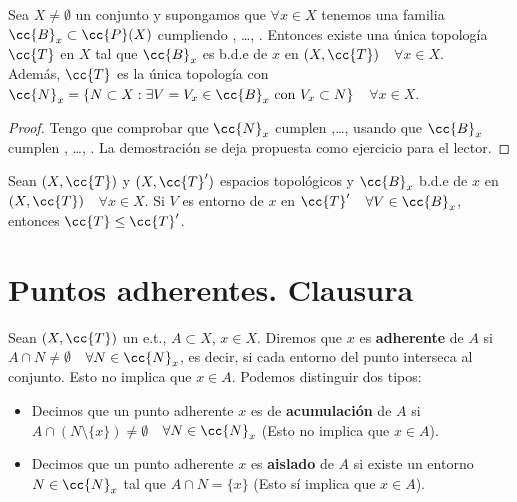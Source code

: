 \begin{prop}
    Sea $X \neq \emptyset$ un conjunto y supongamos que $\forall x \in X$ tenemos una familia $\cc{B}_x \subset \cc{P}(X)$ cumpliendo , \dots, . Entonces existe una única topología $\cc{T}$ en $X$ tal que $\cc{B}_x$ es b.d.e de $x$ en $(X,\cc{T})$\ \ $\forall x \in X$.\\

    Además, $\cc{T}$ es la única topología con $\cc{N}_x=\{N\subset X : \exists V=V_x \in \cc{B}_x\text{ con }V_x\subset N\}$\ \ $\forall x \in X$.

    \begin{proof}
        Tengo que comprobar que $\cc{N}_x$ cumplen ,\dots,  usando que $\cc{B}_x$ cumplen , \dots, . La demostración se deja propuesta como ejercicio para el lector. %
    \end{proof}
\end{prop}

\begin{ejercicio}
    Sean $(X, \cc{T})$ y $(X, \cc{T}')$ espacios topológicos y $\cc{B}_x$ b.d.e de $x$ en $(X,\cc{T})$\ \ $\forall x \in X$. Si $V$ es entorno de $x$ en $\cc{T}'$\ \ $\forall V \in \cc{B}_x$, entonces $\cc{T} \leq \cc{T}'$.
    \endsquare
\end{ejercicio}

\section{Puntos adherentes. Clausura}

\begin{definicion}
    Sean $(X, \cc{T})$ un e.t., $A\subset X$, $x\in X$. Diremos que $x$ es \textbf{adherente} de $A$ si $A\cap N\neq\emptyset$\ \ $\forall N \in \cc{N}_x$, es decir, si cada entorno del punto interseca al conjunto. Esto no implica que $x\in A$. Podemos distinguir dos tipos:
    \begin{itemize}
        \item Decimos que un punto adherente $x$ es de \textbf{acumulación} de $A$ si $A\cap(N\setminus\{x\})\neq \emptyset$\ \ $\forall N \in \cc{N}_x$ (Esto no implica que $x\in A$).
        \item Decimos que un punto adherente $x$ es \textbf{aislado} de $A$ si existe un entorno $N\in \cc{N}_x$ tal que $A\cap N=\{x\}$ (Esto sí implica que $x\in A$).
    \end{itemize}
    \endsquare
\end{definicion}

